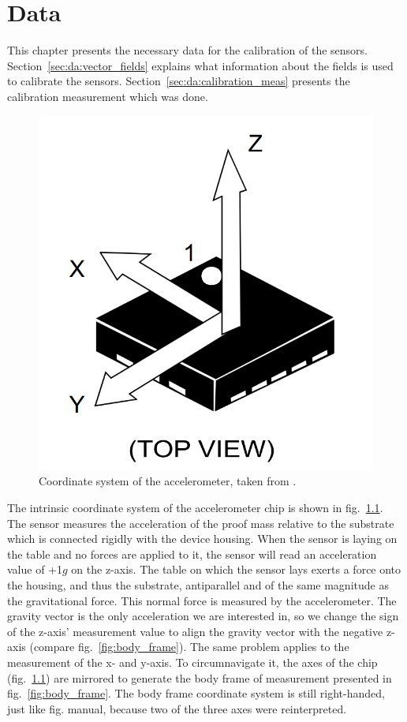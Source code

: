 \chapter{Data \label{ch:data}}
This chapter presents the necessary data for the calibration of the sensors. Section~\ref{sec:da:vector_fields} explains what information about the fields is used to calibrate the sensors. Section~\ref{sec:da:calibration_meas} presents the calibration measurement which was done. 

\begin{figure}
    \centering
    \includegraphics[width=\linewidth]{images/03_data/chip_coord_sys.png}
    \caption[Coordinate system of the accelerometer.]{Coordinate system of the accelerometer, taken from \parencite{lis3dh}.}
    \label{fig:data:chip_coord_sys}
\end{figure}
The intrinsic coordinate system of the accelerometer chip is shown in fig.~\ref{fig:data:chip_coord_sys}. The sensor measures the acceleration of the proof mass relative to the substrate which is connected rigidly with the device housing. When the sensor is laying on the table and no forces are applied to it, the sensor will read an acceleration value of +1$g$ on the z-axis. The table on which the sensor lays exerts a force onto the housing, and thus the substrate, antiparallel and of the same magnitude as the gravitational force. This normal force is measured by the accelerometer. The gravity vector is the only acceleration we are interested in, so we change the sign of the z-axis' measurement value to align the gravity vector with the negative z-axis (compare fig.~\ref{fig:body_frame}). The same problem applies to the measurement of the x- and y-axis. To circumnavigate it, the axes of the chip (fig.~\ref{fig:data:chip_coord_sys}) are mirrored to generate the body frame of measurement presented in fig.~\ref{fig:body_frame}. The body frame coordinate system is still right-handed, just like fig. manual, because two of the three axes were reinterpreted.

